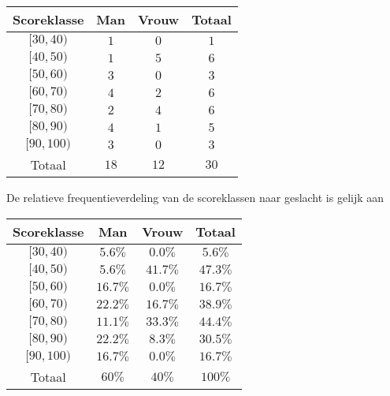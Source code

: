 \begin{enumerate}[label=(\alph*)]
{        \begin{center}
            \begin{tabular}{ccc|c}
                \toprule
                    {\bfseries Scoreklasse} & {\bfseries Man} & {\bfseries Vrouw} & {\bfseries Totaal} \\
                \midrule
                    $[30, 40)$ & $1$ & $0$ & $1$ \\
                    $[40, 50)$ & $1$ & $5$ & $6$ \\
                    $[50, 60)$ & $3$ & $0$ & $3$ \\
                    $[60, 70)$ & $4$ & $2$ & $6$ \\
                    $[70, 80)$ & $2$ & $4$ & $6$ \\
                    $[80, 90)$ & $4$ & $1$ & $5$ \\
                    $[90, 100)$ & $3$ & $0$ & $3$ \\
                \midrule    
                    Totaal & $18$ & $12$ & $30$ \\
                \bottomrule
            \end{tabular}
        \end{center}
        De relatieve frequentieverdeling van de scoreklassen naar geslacht is gelijk aan

        \begin{center}
            \begin{tabular}{ccc|c}
                \toprule
                    {\bfseries Scoreklasse} & {\bfseries Man} & {\bfseries Vrouw} & {\bfseries Totaal} \\
                \midrule
                    $[30, 40)$ & $5.6\%$ & $0.0\%$ & $5.6\%$ \\
                    $[40, 50)$ & $5.6\%$ & $41.7\%$ & $47.3\%$ \\
                    $[50, 60)$ & $16.7\%$ & $0.0\%$ & $16.7\%$ \\
                    $[60, 70)$ & $22.2\%$ & $16.7\%$ & $38.9\%$ \\
                    $[70, 80)$ & $11.1\%$ & $33.3\%$ & $44.4\%$ \\
                    $[80, 90)$ & $22.2\%$ & $8.3\%$ & $30.5\%$ \\
                    $[90, 100)$ & $16.7\%$ & $0.0\%$ & $16.7\%$ \\
                \midrule    
                    Totaal & $60\%$ & $40\%$ & $100\%$ \\
                \bottomrule
            \end{tabular}
        \end{center}
    }


\end{enumerate}
